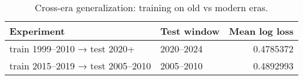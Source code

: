 \begin{table}

\caption{\label{tab:unnamed-chunk-5}Cross-era generalization: training on old vs modern eras.}
\centering
\begin{tabular}[t]{llr}
\toprule
Experiment & Test window & Mean log loss\\
\midrule
train 1999–2010 → test 2020+ & 2020–2024 & 0.4785372\\
train 2015–2019 → test 2005–2010 & 2005–2010 & 0.4892993\\
\bottomrule
\end{tabular}
\end{table}
